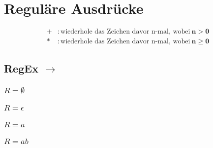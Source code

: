 \chapter{Reguläre Ausdrücke}
\begin{align*}
    \mathbf{+} &: \text{wiederhole das Zeichen davor n-mal, wobei}\ \mathbf{n > 0}\\
    \mathbf{*} &: \text{wiederhole das Zeichen davor n-mal, wobei}\ \mathbf{n \ge 0}
\end{align*}
\section[RegEx zu NEA]{RegEx $\to$ \enea}
\subsection[Regulärer Ausdruck: Leere Menge]{$R = \emptyset$}
\begin{figure}[H]
    \centering
    \begin{transitiongraph}[fa]
    \end{transitiongraph}
\end{figure}
\subsection[Regulärer Ausdruck: Leeres Wort]{$R = \epsilon$}
\begin{figure}[H]
    \centering
    \begin{transitiongraph}[fa]
    \end{transitiongraph}
\end{figure}
\subsection[Regulärer Ausdruck: Eingabesymbol]{$R = a$}
\begin{figure}[H]
    \centering
    \begin{transitiongraph}[fa]
    \end{transitiongraph}
\end{figure}
\subsection[Regulärer Ausdruck: Verkettung]{$R = ab$}
\begin{figure}[H]
    \centering
    \begin{transitiongraph}[fa]
    \end{transitiongraph}
\end{figure}
